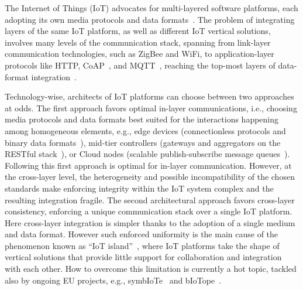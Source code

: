 The Internet of Things (IoT) advocates for multi-layered software platforms,
each adopting its own media protocols and data
formats~\cite{GubbiBMP13,Atzori20102787,7123563}.
%
The problem of integrating layers of the same IoT platform, as well as different
IoT vertical solutions, involves many levels of the communication stack,
spanning from link-layer communication technologies, such as ZigBee and WiFi, to
application-layer protocols like HTTP, CoAP~\cite{coap,doi:10.17487/RFC7252},
and MQTT~\cite{mqtt,mqtt-v3.1.1}, reaching the top-most layers of data-format
integration~\cite{Milenkovic:2015:CII:2843962.2822643}.

Technology-wise, architects of IoT platforms can choose between two approaches
at odds. The first approach favors optimal in-layer communications, i.e.,
choosing media protocols and data formats best suited for the interactions
happening among homogeneous elements, e.g., edge devices (connectionless
protocols and binary data formats~\cite{7123563}), mid-tier controllers
(gateways and aggregators on the RESTful stack~\cite{richardson2008restful}), or
Cloud nodes (scalable publish-subscribe message queues~\cite{garg2013apache}).
Following this first approach is optimal for in-layer communication. However, at
the cross-layer level, the heterogeneity and possible incompatibility of the
chosen standards make enforcing integrity within the IoT system complex and the
resulting integration fragile. The second architectural approach favors
cross-layer consistency, enforcing a unique communication stack over a single
IoT platform. Here cross-layer integration is simpler thanks to the adoption of
a single medium and data format. However such enforced uniformity is the main
cause of the phenomenon known as ``IoT island''~\cite{Soursos16,Gojmerac16},
where IoT platforms take the shape of vertical solutions that provide little
support for collaboration and integration with each other. How to overcome this
limitation is currently a hot topic, tackled also by ongoing EU projects, e.g.,
symbIoTe~\cite{Gojmerac16} and bIoTope~\cite{biotope}.


